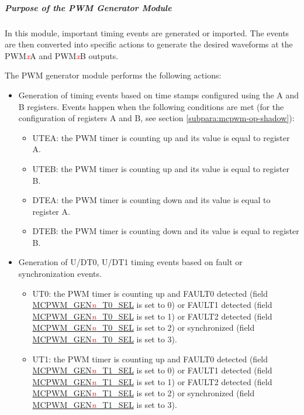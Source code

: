 \documentclass[main\_\_EN.tex]{subfiles}
\begin{document}
\subparagraph{Purpose of the PWM Generator Module}
In this module, important timing events are generated or imported. The events are then converted into specific actions to generate the desired waveforms at the PWM\textcolor{red}{\it{x}}A and PWM\textcolor{red}{\it{x}}B outputs.

The PWM generator module performs the following actions:
\begin{itemize}
    \item Generation of timing events based on time stamps configured using the A and B registers. Events happen when the following conditions are met (for the configuration of registers A and B, see section \ref{subpara:mcpwm-op-shadow}):
    \begin{itemize}
        \item UTEA: the PWM timer is counting up and its value is equal to register A.
        \item UTEB: the PWM timer is counting up and its value is equal to register B.
        \item DTEA: the PWM timer is counting down and its value is equal to register A.
        \item DTEB: the PWM timer is counting down and its value is equal to register B.
    \end{itemize}
    \item Generation of U/DT0, U/DT1 timing events based on fault or synchronization events.
    \begin{itemize}
        \item UT0: the PWM timer is counting up and FAULT0 detected (field \hyperref[fielddesc:MCPWMGENNT0SEL]{MCPWM\_GEN\textcolor{red}{\it{n}}\_T0\_SEL} is set to 0) or FAULT1 detected (field \hyperref[fielddesc:MCPWMGENNT0SEL]{MCPWM\_GEN\textcolor{red}{\it{n}}\_T0\_SEL} is set to 1) or FAULT2 detected (field \hyperref[fielddesc:MCPWMGENNT0SEL]{MCPWM\_GEN\textcolor{red}{\it{n}}\_T0\_SEL} is set to 2) or synchronized (field \hyperref[fielddesc:MCPWMGENNT0SEL]{MCPWM\_GEN\textcolor{red}{\it{n}}\_T0\_SEL} is set to 3).
        \item UT1: the PWM timer is counting up and FAULT0 detected (field \hyperref[fielddesc:MCPWMGENNT0SEL]{MCPWM\_GEN\textcolor{red}{\it{n}}\_T1\_SEL} is set to 0) or FAULT1 detected (field \hyperref[fielddesc:MCPWMGENNT0SEL]{MCPWM\_GEN\textcolor{red}{\it{n}}\_T1\_SEL} is set to 1) or FAULT2 detected (field \hyperref[fielddesc:MCPWMGENNT0SEL]{MCPWM\_GEN\textcolor{red}{\it{n}}\_T1\_SEL} is set to 2) or synchronized (field \hyperref[fielddesc:MCPWMGENNT0SEL]{MCPWM\_GEN\textcolor{red}{\it{n}}\_T1\_SEL} is set to 3).

\end{itemize}
\end{itemize}
\end{document}
